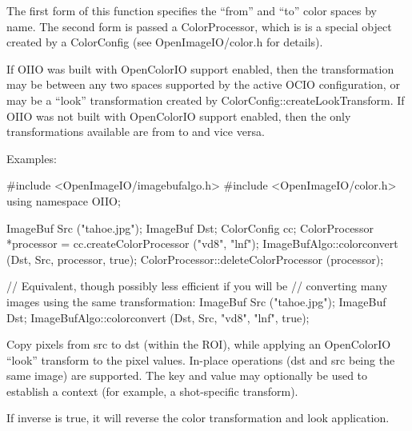 The first form of this function specifies the ``from''
and ``to'' color spaces by name.
The second form is passed a {\cf ColorProcessor},
which is is a special object created by a
{\cf ColorConfig} (see {\cf OpenImageIO/color.h} for details).

If OIIO was built with OpenColorIO support enabled, then the transformation
may be between any two spaces supported by the active OCIO configuration, or
may be a ``look'' transformation created by {\cf
ColorConfig::createLookTransform}.  If OIIO was not built with OpenColorIO
support enabled, then the only transformations available are from 
to  and vice versa.

\smallskip
\noindent Examples:
\begin{code}
    #include <OpenImageIO/imagebufalgo.h>
    #include <OpenImageIO/color.h>
    using namespace OIIO;

    ImageBuf Src ("tahoe.jpg");
    ImageBuf Dst;
    ColorConfig cc;
    ColorProcessor *processor = cc.createColorProcessor ("vd8", "lnf");
    ImageBufAlgo::colorconvert (Dst, Src, processor, true);
    ColorProcessor::deleteColorProcessor (processor);

    // Equivalent, though possibly less efficient if you will be
    // converting many images using the same transformation:
    ImageBuf Src ("tahoe.jpg");
    ImageBuf Dst;
    ImageBufAlgo::colorconvert (Dst, Src, "vd8", "lnf", true);
\end{code}
\apiend

 
Copy pixels from {\cf src} to {\cf dst} (within the ROI), while
applying an OpenColorIO ``look'' transform to the pixel values.
In-place operations ({\cf dst} and {\cf src} being the same image)
are supported.  The {\cf key} and {\cf value} may optionally be used
to establish a context (for example, a shot-specific transform).

If {\cf inverse} is {\cf true}, it will reverse the color transformation
and look application.

